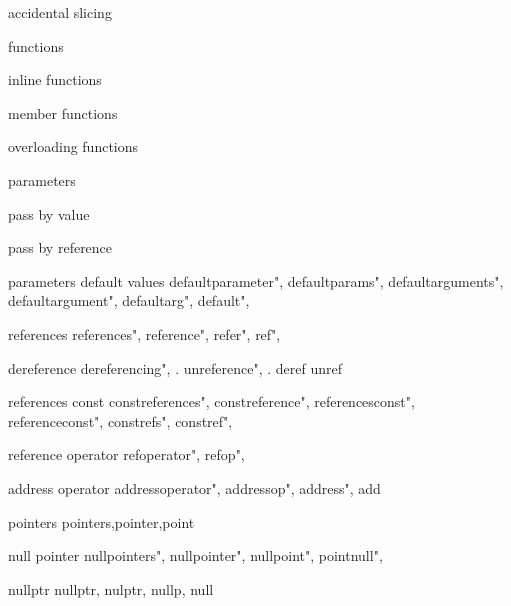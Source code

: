          accidental slicing 
        
         functions
        
         inline functions
        
         member functions

        overloading functions
        
         parameters
        
         pass by value
        
         pass by reference

         parameters default values 
        defaultparameter",  
        defaultparams",  
        defaultarguments",  
        defaultargument",  
        defaultarg",  
        default",  
        
         references 
        references",  
        reference",  
        refer",  
        ref",  
        
         dereference 
        dereferencing", . 
        unreference", . 
        deref
        unref
        
         references const 
        constreferences",
        constreference", 
        referencesconst",
        referenceconst", 
        constrefs",
        constref", 
        
         reference operator 
        refoperator", 
        refop",
        
         address operator 
        addressoperator",
        addressop",
        address",
        add
        
         pointers
        pointers,pointer,point
        
         null pointer
        nullpointers",
        nullpointer", 
        nullpoint",
        pointnull", 
        
         nullptr
        nullptr,
        nulptr,
        nullp,
        null
        
